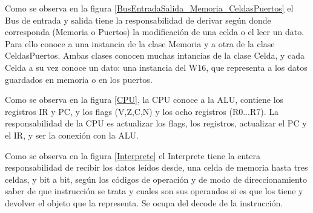
Como se observa en la figura \ref{BusEntradaSalida_Memoria_CeldasPuertos} el Bus de entrada y salida tiene la responsabilidad de derivar según donde corresponda (Memoria o Puertos) la modificación de una celda o el leer un dato. Para ello conoce a una instancia de la clase Memoria y a otra de la clase CeldasPuertos. 
Ambas clases conocen muchas intancias de la clase Celda, y cada Celda a su vez conoce un dato: una instancia del W16, que representa a los datos guardados en memoria o en los puertos.  


Como se observa en la figura \ref{CPU}, la CPU conoce a la ALU, contiene los registros IR y PC, y los flags (V,Z,C,N) y los ocho registros (R0...R7). La responsabilidad de la CPU es actualizar los flags, los registros, actualizar el PC y el IR, y ser la conexión con la ALU.


Como se observa en la figura \ref{Interprete} el Interprete tiene la entera responsabilidad de recibir los datos leídos desde, una celda de memoria hasta tres celdas, y bit a bit, según los códigos de operación y de modo de direccionamiento saber de que instrucción se trata y cuales son sus operandos si es que los tiene y devolver el objeto que la representa. Se ocupa del decode de la instrucción.


